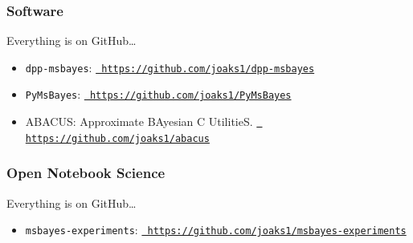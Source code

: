 \begin{frame}
    \frametitle{Software}
    Everything is on GitHub\ldots\\
    \smallskip
    \begin{itemize}
        \item \texttt{dpp-msbayes}:
            \href{https://github.com/joaks1/dpp-msbayes}{\tt
            https://github.com/joaks1/dpp-msbayes}

        \item \texttt{PyMsBayes}:
            \href{https://github.com/joaks1/PyMsBayes}{\tt
            https://github.com/joaks1/PyMsBayes}

        \item ABACUS: Approximate BAyesian C UtilitieS.
            \href{https://github.com/joaks1/abacus}{\tt
            https://github.com/joaks1/abacus}
    \end{itemize}
\end{frame}

\begin{frame}
    \frametitle{Open Notebook Science}
    Everything is on GitHub\ldots\\
    \smallskip
    \begin{itemize}
        \item \texttt{msbayes-experiments}:
            \href{https://github.com/joaks1/msbayes-experiments}{\tt
            https://github.com/joaks1/msbayes-experiments}
    \end{itemize}
\end{frame}

